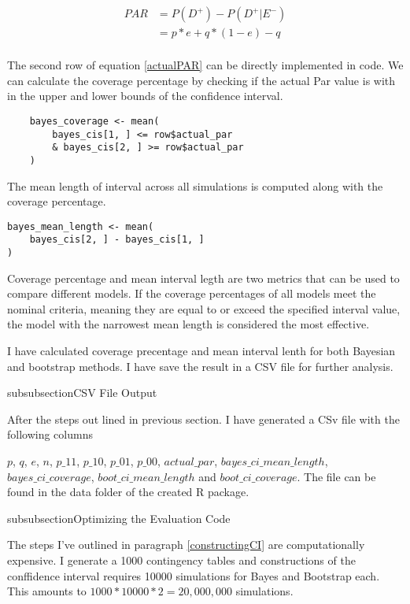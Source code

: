 \begin{equation}
\begin{aligned} \label{actualPAR}
    PAR &= P(D^+) - P(D^+| E^-)     \\
        &= p * e + q * (1 - e) - q  \\
\end{aligned}
\end{equation}

The second row of equation \ref{actualPAR} can be directly implemented in code. We can calculate the coverage percentage by checking if the actual Par value is with in the upper and lower bounds of the confidence interval. 

\begin{lstlisting}
    bayes_coverage <- mean(
        bayes_cis[1, ] <= row$actual_par 
        & bayes_cis[2, ] >= row$actual_par
    )
\end{lstlisting}

The mean length of interval across all simulations is computed along with the coverage percentage.

\begin{lstlisting}
bayes_mean_length <- mean(
    bayes_cis[2, ] - bayes_cis[1, ]
)
\end{lstlisting}

Coverage percentage and mean interval legth are two metrics that can be used to compare different models. If the coverage percentages of all models meet the nominal criteria, meaning they are equal to or exceed the specified interval value, the model with the narrowest mean length is considered the most effective.

I have calculated coverage precentage and mean interval lenth for both Bayesian and bootstrap methods. I have save the result in a CSV file for further analysis.

\*subsubsection{CSV File Output}

After the steps out lined in previous section. I have generated a CSv file with the following columns

$p$, $q$, $e$, $n$, $p\_11$, $p\_10$, $p\_01$, $p\_00$, $actual\_par$, $bayes\_ci\_mean\_length$, $bayes\_ci\_coverage$, $boot\_ci\_mean\_length$ and $boot\_ci\_coverage$. The file can be found in the data folder of the created R package.

\*subsubsection{Optimizing the Evaluation Code}

The steps I've outlined in paragraph \ref{constructingCI} are computationally expensive. I generate a 1000 contingency tables and constructions of the conffidence interval requires 10000 simulations for Bayes and Bootstrap each. This amounts to $1000 * 10000 * 2 = 20,000,000$ simulations. 

